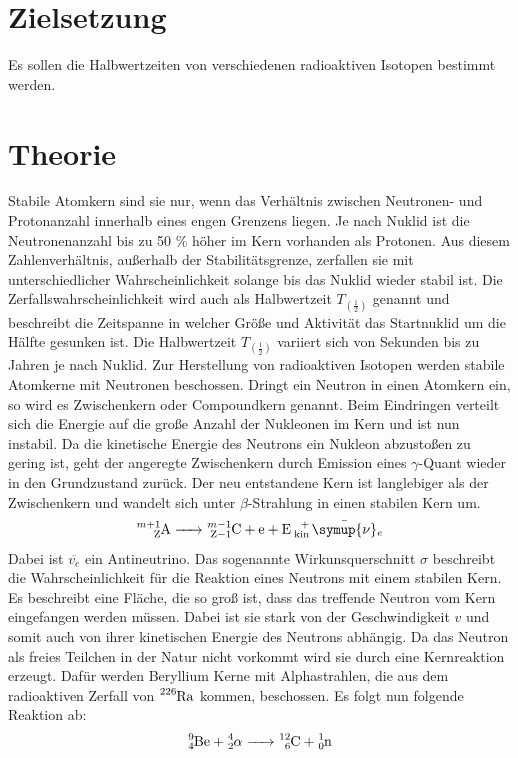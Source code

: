 \section{Zielsetzung}
Es sollen die Halbwertzeiten von verschiedenen radioaktiven Isotopen bestimmt werden.
\section{Theorie}
Stabile Atomkern sind sie nur, wenn das Verhältnis zwischen Neutronen- und Protonanzahl innerhalb eines engen Grenzens
liegen.
Je nach Nuklid ist die Neutronenanzahl bis zu 50 \% höher im Kern vorhanden als Protonen.
Aus diesem Zahlenverhältnis, außerhalb der Stabilitätsgrenze, zerfallen sie mit unterschiedlicher Wahrscheinlichkeit
solange bis das Nuklid wieder stabil ist.
Die Zerfallswahrscheinlichkeit wird auch als Halbwertzeit $T_(\frac{1}{2})$ genannt und beschreibt
die Zeitspanne in welcher Größe und Aktivität das Startnuklid um die Hälfte gesunken ist.
Die Halbwertzeit $T_(\frac{1}{2})$ variiert sich von Sekunden bis zu Jahren je nach Nuklid.
Zur Herstellung von radioaktiven Isotopen werden stabile Atomkerne mit Neutronen beschossen.
Dringt ein Neutron in einen Atomkern ein, so wird es Zwischenkern oder Compoundkern genannt.
Beim Eindringen verteilt sich die Energie auf die große Anzahl der Nukleonen im Kern und ist nun instabil.
Da die kinetische Energie des Neutrons ein Nukleon abzustoßen zu gering ist, geht der angeregte Zwischenkern durch
Emission eines $\gamma$-Quant wieder in den Grundzustand zurück.
Der neu entstandene Kern ist langlebiger als der Zwischenkern und wandelt sich unter $\beta$-Strahlung in einen stabilen
Kern um.
\begin{equation*}
  \ce{^{m+1}_{Z}A  -> ^{m-1}_{Z-1}C + e +E _{\text{kin}}+ \bar{\symup{\nu}}_e}
\end{equation*}
Dabei ist $\overline{v_e}$ ein Antineutrino.
Das sogenannte Wirkunsquerschnitt $\sigma$ beschreibt die Wahrscheinlichkeit für die Reaktion eines Neutrons mit einem stabilen Kern.
Es beschreibt eine Fläche, die so groß ist, dass das treffende Neutron vom Kern eingefangen werden müssen.
Dabei ist sie stark von der Geschwindigkeit $v$ und somit auch von ihrer kinetischen Energie des Neutrons abhängig.
Da das Neutron als freies Teilchen in der Natur nicht vorkommt wird sie durch eine Kernreaktion erzeugt.
Dafür werden Beryllium Kerne mit Alphastrahlen, die aus dem radioaktiven Zerfall von $\ce{^{226}_{}Ra}$ kommen, beschossen. Es folgt nun folgende Reaktion ab:
\begin{equation*}
    \ce{^{9}_{4}Be + ^{4}_{2}$\alpha$ -> ^{12}_{6}C + ^1_0n}
\end{equation*}
